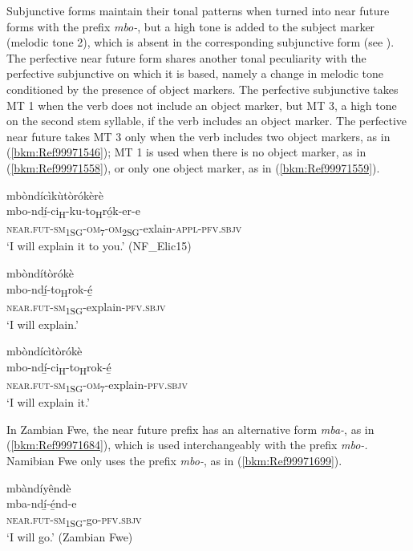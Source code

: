 Subjunctive forms maintain their tonal patterns when turned into near future forms with the prefix \textit{mbo-}, but a high tone is added to the subject marker (melodic tone 2), which is absent in the corresponding subjunctive form (see ). The perfective near future form shares another tonal peculiarity with the perfective subjunctive on which it is based, namely a change in melodic tone conditioned by the presence of object markers. The perfective subjunctive takes MT 1 when the verb does not include an object marker, but MT 3, a high tone on the second stem syllable, if the verb includes an object marker. The perfective near future takes MT 3 only when the verb includes two object markers, as in (\ref{bkm:Ref99971546}); MT 1 is used when there is no object marker, as in (\ref{bkm:Ref99971558}), or only one object marker, as in (\ref{bkm:Ref99971559}).

\ea
\label{bkm:Ref99971546}
\glll mbòndícìkùtòrókèrè\\
mbo-ndí̲-ci\textsubscript{H}-ku-to\textsubscript{H}ró̲k-er-e\\
\textsc{near}.\textsc{fut}-\textsc{sm}\textsubscript{1SG}-\textsc{om}\textsubscript{7}-\textsc{om}\textsubscript{2SG}-exlain-\textsc{appl}-\textsc{pfv}.\textsc{sbjv}\\
\glt ‘I will explain it to you.’ (NF\_Elic15)
\z

\ea
\label{bkm:Ref99971558}
\glll mbòndítòrókè\\
mbo-ndí̲-to\textsubscript{H}rok-é̲\\
\textsc{near}.\textsc{fut}-\textsc{sm}\textsubscript{1SG}-explain-\textsc{pfv}.\textsc{sbjv}\\
\glt ‘I will explain.’
\z

\ea
\label{bkm:Ref99971559}
\glll mbòndícìtòrókè\\
mbo-ndí̲-ci\textsubscript{H}-to\textsubscript{H}rok-é̲\\
\textsc{near}.\textsc{fut}-\textsc{sm}\textsubscript{1SG}-\textsc{om}\textsubscript{7}-explain-\textsc{pfv}.\textsc{sbjv}\\
\glt ‘I will explain it.’
\z

In Zambian Fwe, the near future prefix has an alternative form \textit{mba-}, as in (\ref{bkm:Ref99971684}), which is used interchangeably with the prefix \textit{mbo-.} Namibian Fwe only uses the prefix \textit{mbo-}, as in (\ref{bkm:Ref99971699}).

\ea
\label{bkm:Ref99971684}
\glll mbàndíyêndè\\
mba-ndí̲-é̲nd-e\\
\textsc{near}.\textsc{fut}-\textsc{sm}\textsubscript{1SG}-go-\textsc{pfv}.\textsc{sbjv}\\
\glt ‘I will go.’ (Zambian Fwe)
\z

